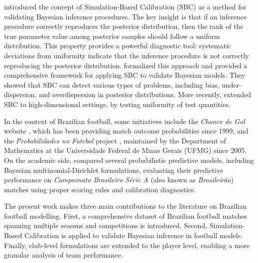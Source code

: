 \textcite{cook_2006} introduced the concept of Simulation-Based Calibration (SBC) as a method for validating Bayesian inference procedures.
The key insight is that if an inference procedure correctly reproduces the posterior distribution, then the rank of the true parameter value among posterior samples should follow a uniform distribution.
This property provides a powerful diagnostic tool: systematic deviations from uniformity indicate that the inference procedure is not correctly reproducing the posterior distribution.
\textcite{talts_2020} formalized this approach and provided a comprehensive framework for applying SBC to validate Bayesian models.
They showed that SBC can detect various types of problems, including bias, under-dispersion, and overdispersion in posterior distributions.
More recently, \textcite{modrak_2025} extended SBC to high-dimensional settings, by testing uniformity of test quantities.

In the context of Brazilian football, some initiatives include the \textit{Chance de Gol} website \cite{chancedegol}, which has been providing match outcome probabilities since 1999, and the \textit{Probabilidades no Futebol} project \cite{ufmg_futebol}, maintained by the Department of Mathematics at the Universidade Federal de Minas Gerais (UFMG) since 2005.
On the academic side, \textcite{diniz_2018} compared several probabilistic predictive models, including Bayesian multinomial-Dirichlet formulations, evaluating their predictive performance on \textit{Campeonato Brasileiro Série A} (also known as \textit{Brasileirão}) matches using proper scoring rules and calibration diagnostics.

The present work makes three main contributions to the literature on Brazilian football modelling.
First, a comprehensive dataset of Brazilian football matches spanning multiple seasons and competitions is introduced.
Second, Simulation-Based Calibration is applied to validate Bayesian inference in football models.
Finally, club-level formulations are extended to the player level, enabling a more granular analysis of team performance.
